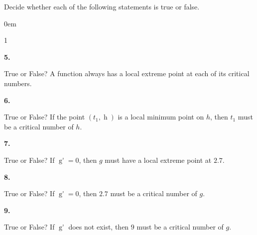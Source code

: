 \documentclass[12pt,]{book}
\theoremstyle{plain}
\theoremstyle{definition}
\numberwithin{equation}{section}
\newenvironment{exercisegroup}%
{\medskip\noindent}%
{\par\bigskip}%
\newlength{\exercisegroupindent}%
\newlength{\exercisegroupitemwidth}%
\newenvironment{exercisegrouplist}%
{\vspace{-\partopsep}%
\begin{adjustwidth}{\exercisegroupindent}{0em}}%
{\end{adjustwidth}%
\vspace{-\partopsep}%
\vspace{\baselineskip}}%
\newenvironment{exercisegroupbycol}[1]%
{\begin{exercisegrouplist}%
\vspace{-\multicolsep}%
\begin{multicols}{#1}%
\setlength{\parindent}{0em}%
\setlength{\exercisegroupitemwidth}{\linewidth}}%
{\end{multicols}%
\vspace{-\multicolsep}%
\end{exercisegrouplist}}%
\newenvironment{exercisegroupitem}[1]%
{\begin{minipage}[t]{\exercisegroupitemwidth}
\vspace{0pt}%
{\bfseries#1}%
\rule{0pt}{\baselineskip}}{\strut%
\end{minipage}%
\hspace{\columnsep}}%
\providecommand\phantomsection{}
\newcommand{\fe}[2]{\mathop{{#1}{\left(#2\right)}}}
\newcommand{\point}[2]{\left(#1,#2\right)}
\newcommand{\fd}[1]{#1'}
\begin{document}
\begin{exercisegroup}%
Decide whether each of the following statements is true or false.%
\par
\begin{exercisegroupbycol}{1}%
\begin{exercisegroupitem}{5. }\phantomsection\hypertarget{exercise-7}{\null}
True or False? A function always has a local extreme point at each of its critical numbers.%
\end{exercisegroupitem}%
\par%
\begin{exercisegroupitem}{6. }\phantomsection\hypertarget{exercise-8}{\null}
True or False? If the point \(\point{t_1}{\fe{h}{t_1}}\) is a local minimum point on \(h\), then \(t_1\) must be a critical number of \(h\).%
\end{exercisegroupitem}%
\par%
\begin{exercisegroupitem}{7. }\phantomsection\hypertarget{exercise-9}{\null}
True or False? If \(\fe{\fd{g}}{2.7}=0\), then \(g\) must have a local extreme point at \(2.7\).%
\end{exercisegroupitem}%
\par%
\begin{exercisegroupitem}{8. }\phantomsection\hypertarget{exercise-10}{\null}
True or False? If \(\fe{\fd{g}}{2.7}=0\), then \(2.7\) must be a critical number of \(g\).%
\end{exercisegroupitem}%
\par%
\begin{exercisegroupitem}{9. }\phantomsection\hypertarget{exercise-11}{\null}
True or False? If \(\fe{\fd{g}}{9}\) does not exist, then \(9\) must be a critical number of \(g\).%
\end{exercisegroupitem}%
\par%
\end{exercisegroupbycol}%
\end{exercisegroup}%
\typeout{************************************************}
\typeout{************************************************}
\end{document}
